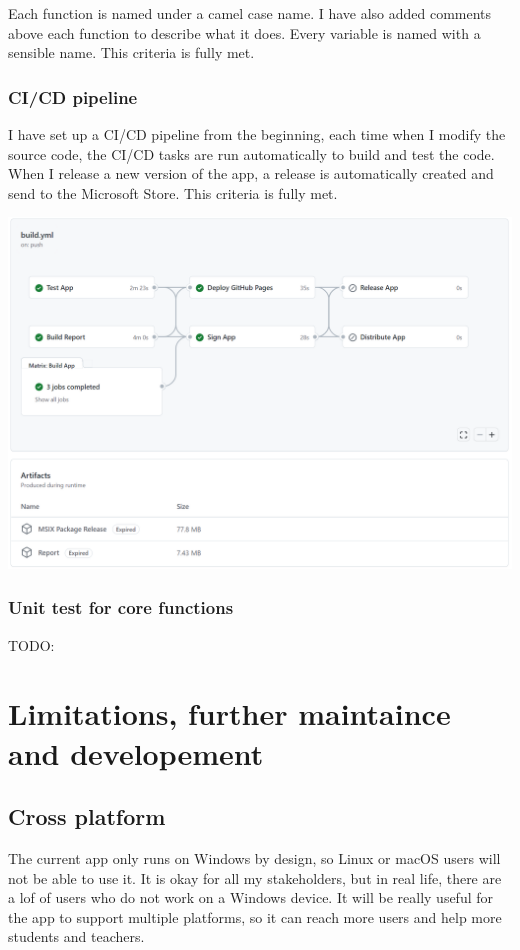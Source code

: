 \documentclass[a4paper]{report}
\begin{document}
Each function is named under a camel case name. I have also added comments above each function to describe what it does. Every variable is named with a sensible name. This criteria is fully met.

\subsubsection{CI/CD pipeline}

I have set up a CI/CD pipeline from the beginning, each time when I modify the source code, the CI/CD tasks are run automatically to build and test the code. When I release a new version of the app, a release is automatically created and send to the Microsoft Store. This criteria is fully met.

\includegraphics[width=\textwidth, height=\textheight, keepaspectratio]{CICD}


\subsubsection{Unit test for core functions}

TODO:

\section{Limitations, further maintaince and developement}

\subsection{Cross platform}

The current app only runs on Windows by design, so Linux or macOS users will not be able to use it. It is okay for all my stakeholders, but in real life, there are a lof of users who do not work on a Windows device. It will be really useful for the app to support multiple platforms, so it can reach more users and help more students and teachers.
\end{document}
